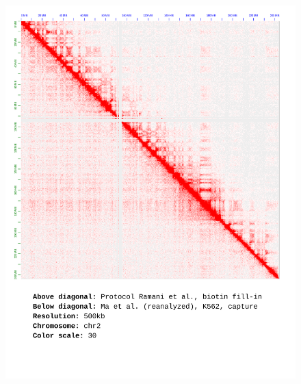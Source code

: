 \documentclass[a4paper,14pt]{extarticle}
\begin{document}
\begin{figure}[hp!] \includegraphics[width=1\textwidth]{ma-pe_s30_chr2_500kb_30.pdf} \end{figure}
\end{document}
